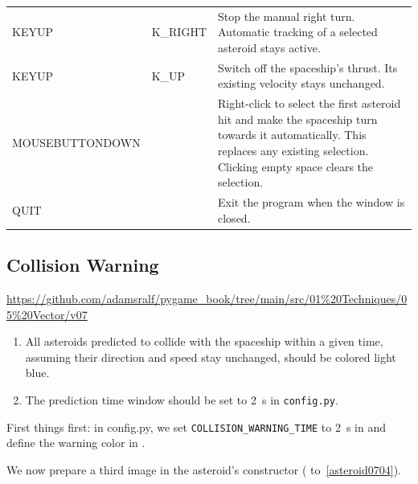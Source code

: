 \begin{longtable}{>{\ttfamily}l>{\ttfamily}lp{8.5cm}}
	KEYUP & K\_RIGHT &
	Stop the manual right turn. Automatic
	tracking of a selected asteroid stays active. \\
	
	KEYUP & K\_UP &
	Switch off the spaceship's thrust.
	Its existing velocity stays unchanged. \\
	
	MOUSEBUTTONDOWN & 3 &
	Right-click to select the first asteroid hit
	and make the spaceship turn towards it automatically.
	This replaces any existing selection.
	Clicking empty space clears the selection. \\
	
	QUIT &  &
	Exit the program when the window is closed. \\
	
\end{longtable}



\newpage
\subsection{Collision Warning}\label{secVectorCollisionWarning}

\begin{diskbox}
	\url{https://github.com/adamsralf/pygame_book/tree/main/src/01%20Techniques/05%20Vector/v07}
\end{diskbox}


\begin{enumerate}
	\item All asteroids predicted to collide with the spaceship within a given time, assuming their direction and speed stay unchanged, should be colored light blue.
	\item The prediction time window should be set to \SI{2}{\second} in \texttt{config.py}.
\end{enumerate}
\er

First things first: in config.py, we set \texttt{COLLISION\_WARNING\_TIME} to \SI{2}{\second} in  and define the warning color in .


\newpage
We now prepare a third image in the asteroid's constructor ( to~\ref{asteroid0704}).

